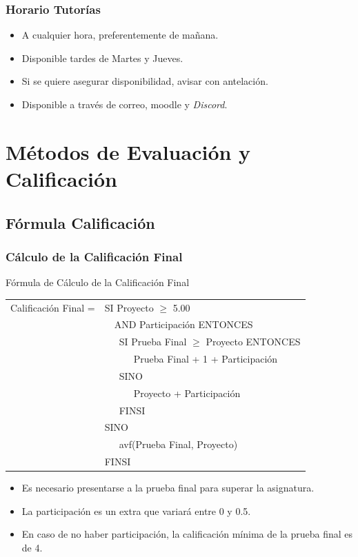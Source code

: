 \documentclass[handout,a4paper,slidestop,xcolor=pst,dvips,blue]{beamer}
\begin{document}
\begin{frame}[c]
	\frametitle{Horario Tutorías}
    \begin{itemize}[<+->]
        \item A cualquier hora, preferentemente de mañana.
        \item Disponible tardes de Martes y Jueves.
        \item Si se quiere asegurar disponibilidad, avisar con antelación.
        \item Disponible a través de correo, moodle y \emph{Discord}.
	\end{itemize}
\end{frame}

\section{Métodos de Evaluación y Calificación}

\subsection{Fórmula Calificación}

\begin{frame}[c]
	\frametitle{Cálculo de la Calificación Final}
	\begin{block}{Fórmula de Cálculo de la Calificación Final}
		\begin{scriptsize}
        \begin{tabular}{ll}
			Calificación Final = & SI Proyecto $\geq$ 5.00 \\
                                 & \ \ AND Participación ENTONCES \\
                                 & \ \ \ SI Prueba Final  $\geq$ Proyecto ENTONCES \\
                                 & \ \ \ \ \ \ Prueba Final + 1 + Participación \\
                                 & \ \ \ SINO \\
                                 & \ \ \ \ \ \ Proyecto + Participación \\
                                 & \ \ \ FINSI \\
                                 & SINO \\
                                 & \ \ \ avf(Prueba Final, Proyecto)  \\
                                 & FINSI \\
		\end{tabular}
        \end{scriptsize}
	\end{block}
	\begin{itemize}
		\item<2-> Es necesario presentarse a la prueba final para superar la asignatura.
        \item<3-> La participación es un extra que variará entre 0 y 0.5.
        \item<4-> En caso de no haber participación, la calificación mínima de la prueba final es de 4.
	\end{itemize}
\end{frame}
\end{document}
